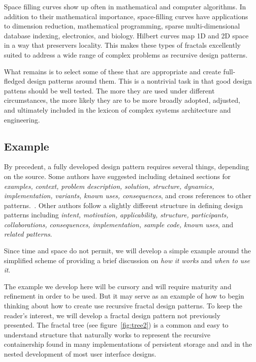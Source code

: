 \documentclass[jou,apacite]{apa6}
\begin{document}
Space filling curves show up often in mathematical and computer algorithms.  In addition to their mathematical importance, space-filling curves have applications to dimension reduction, mathematical programming, sparse multi-dimensional database indexing, electronics, and biology.  Hilbert curves map 1D and 2D space in a way that preservers locality.  This makes these types of fractals excellently suited to address a wide range of complex problems as recursive design patterns.

What remains is to select some of these that are appropriate and create full-fledged design patterns around them.  This is a nontrivial task in that good design pattens should be well tested.  The more they are used under different circumstances, the more likely they are to be more broadly adopted, adjusted, and ultimately included in the lexicon of complex systems architecture and engineering.

\subsection{Example} %
By precedent, a fully developed design pattern requires several things, depending on the source.  Some authors have suggested including detained sections for \emph{examples, context, problem description, solution, structure, dynamics, implementation, variants, known uses, consequences}, and cross references to other patterns.~\cite{Buschmann}.  Other authors follow a slightly different structure in defining design patterns including \emph{intent, motivation, applicability, structure, participants, collaborations, consequences, implementation, sample code, known uses}, and \emph{related patterns}.~\cite{Gamma}

Since time and space do not permit, we will develop a simple example around the simplified scheme of providing a brief discussion on \emph{how it works} and \emph{when to use it}.~\cite{Fowler}

The example we develop here will be cursory and will require maturity and refinement in order to be used.  But it may serve as an example of how to begin thinking about how to create use recursive fractal design patterns.  To keep the reader's interest, we will develop a fractal design pattern not previously presented.  The fractal tree (see figure~\ref{fig:tree2}) is a common and easy to understand structure that naturally works to represent the recursive containership found in many implementations of persistent storage and and in the nested development of most user interface designs.
\end{document}
